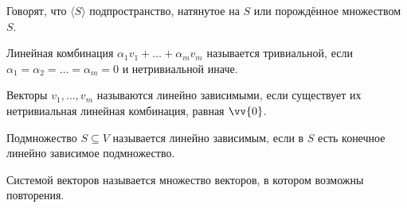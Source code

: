 \documentclass[12pt]{article}
\begin{document}
\begin{definition}
	Говорят, что $\langle S\rangle$ подпространство, натянутое на $S$
	или порождённое множеством $S$.
\end{definition}
\begin{definition}
	Линейная комбинация $\alpha_1v_1+\ldots+\alpha_mv_m$ называется
	тривиальной, если $\alpha_1=\alpha_2=\ldots=\alpha_m=0$ и нетривиальной иначе.
\end{definition}
\begin{definition}
	Векторы $v_1,\ldots,v_m$ называются линейно зависимыми, если
	существует их нетривиальная линейная комбинация, равная $\vv{0}$.
\end{definition}
\begin{definition}
	Подмножество $S\subseteq V$ называется линейно зависимым, если в $S$
	есть конечное линейно зависимое подмножество.
\end{definition}
\begin{definition}
	Системой векторов называется множество векторов, в котором возможны повторения.
\end{definition}
\end{document}
